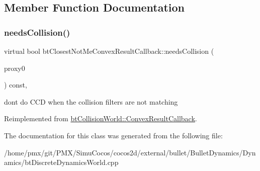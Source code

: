 \subsection{Member Function Documentation}
\mbox{\label{classbtClosestNotMeConvexResultCallback_ac6aca2b0d095fc7d4ece514371a9fdf2}} 
\subsubsection{\texorpdfstring{needs\+Collision()}{needsCollision()}}
{\footnotesize\ttfamily virtual bool bt\+Closest\+Not\+Me\+Convex\+Result\+Callback\+::needs\+Collision (\begin{DoxyParamCaption}\item[{bt\+Broadphase\+Proxy $\ast$}]{proxy0 }\end{DoxyParamCaption}) const\hspace{0.3cm}{\ttfamily [inline]}, {\ttfamily [virtual]}}

don\textquotesingle{}t do C\+CD when the collision filters are not matching 

Reimplemented from \hyperlink{structbtCollisionWorld_1_1ConvexResultCallback}{bt\+Collision\+World\+::\+Convex\+Result\+Callback}.



The documentation for this class was generated from the following file\+:\begin{DoxyCompactItemize}
\item 
/home/pmx/git/\+P\+M\+X/\+Simu\+Cocos/cocos2d/external/bullet/\+Bullet\+Dynamics/\+Dynamics/bt\+Discrete\+Dynamics\+World.\+cpp\end{DoxyCompactItemize}
